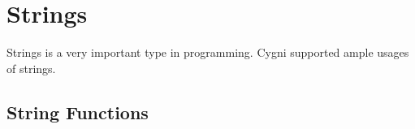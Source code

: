 \chapter{Strings}
Strings is a very important type in programming. Cygni supported ample usages of strings.
\section{String Functions}

